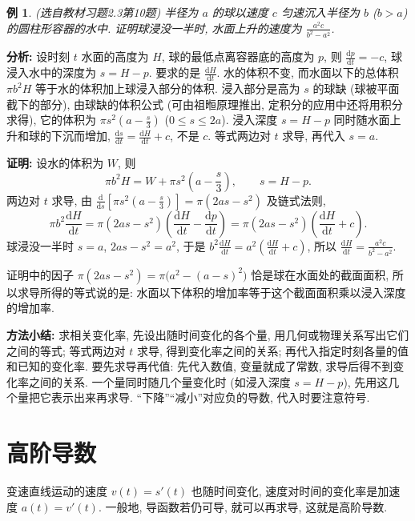 \documentclass[UTF8,openany]{ctexbook}
\theoremstyle{chinesetextbook}
\newtheorem{example}{例}[section]
\newenvironment{cnproof}{\par\indent\textbf{证明:} \ignorespaces}{\par}
\newcommand{\dd}{\mathrm d}
\begin{document}
\begin{example}\label{ex:c2-h3-10}
\textnormal{(选自教材习题2.3第10题)} 半径为 $a$ 的球以速度 $c$ 匀速沉入半径为 $b$ ($b>a$) 的圆柱形容器的水中. 证明球浸没一半时, 水面上升的速度为 $\displaystyle\frac{a^2c}{b^2-a^2}$.
\end{example}
\par\indent\textbf{分析:} 设时刻 $t$ 水面的高度为 $H$, 球的最低点离容器底的高度为 $p$, 则 $\displaystyle\frac{\dd p}{\dd t}=-c$, 球浸入水中的深度为 $s=H-p$. 要求的是 $\displaystyle\frac{\dd H}{\dd t}$. 水的体积不变, 而水面以下的总体积 $\pi b^2H$ 等于水的体积加上球浸入部分的体积. 浸入部分是高为 $s$ 的球缺 (球被平面截下的部分), 由球缺的体积公式 (可由祖暅原理推出, 定积分的应用中还将用积分求得), 它的体积为 $\displaystyle\pi s^2\left(a-\frac s3\right)$ ($0\le s\le2a$). 浸入深度 $s=H-p$ 同时随水面上升和球的下沉而增加, $\displaystyle\frac{\dd s}{\dd t}=\frac{\dd H}{\dd t}+c$, 不是 $c$. 等式两边对 $t$ 求导, 再代入 $s=a$.
\begin{cnproof}
设水的体积为 $W$, 则
\[
\pi b^2H=W+\pi s^2\left(a-\frac s3\right),\qquad s=H-p.
\]
两边对 $t$ 求导, 由 $\displaystyle\frac{\dd}{\dd s}\left[\pi s^2\left(a-\frac s3\right)\right]=\pi(2as-s^2)$ 及链式法则,
\[
\pi b^2\frac{\dd H}{\dd t}=\pi(2as-s^2)\left(\frac{\dd H}{\dd t}-\frac{\dd p}{\dd t}\right)=\pi(2as-s^2)\left(\frac{\dd H}{\dd t}+c\right).
\]
球浸没一半时 $s=a$, $2as-s^2=a^2$, 于是 $\displaystyle b^2\frac{\dd H}{\dd t}=a^2\left(\frac{\dd H}{\dd t}+c\right)$, 所以 $\displaystyle\frac{\dd H}{\dd t}=\frac{a^2c}{b^2-a^2}$.
\end{cnproof}
证明中的因子 $\pi(2as-s^2)=\pi\bigl(a^2-(a-s)^2\bigr)$ 恰是球在水面处的截面面积, 所以求导所得的等式说的是: 水面以下体积的增加率等于这个截面面积乘以浸入深度的增加率.
\par\indent\textbf{方法小结:} 求相关变化率, 先设出随时间变化的各个量, 用几何或物理关系写出它们之间的等式; 等式两边对 $t$ 求导, 得到变化率之间的关系; 再代入指定时刻各量的值和已知的变化率. 要先求导再代值: 先代入数值, 变量就成了常数, 求导后得不到变化率之间的关系. 一个量同时随几个量变化时 (如浸入深度 $s=H-p$), 先用这几个量把它表示出来再求导. “下降”“减小”对应负的导数, 代入时要注意符号.
\section{高阶导数}
变速直线运动的速度 $v(t)=s'(t)$ 也随时间变化, 速度对时间的变化率是加速度 $a(t)=v'(t)$. 一般地, 导函数若仍可导, 就可以再求导, 这就是高阶导数.
\end{document}
